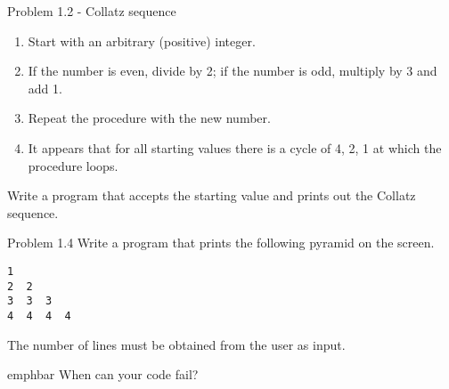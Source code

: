 \documentclass[14pt,compress]{beamer}
\newcommand{\emphbar}[1]
{\begin{beamercolorbox}[rounded=true]{emphbar} 
      {#1}
 \end{beamercolorbox}
}
\newcounter{time}
\newcommand{\inctime}[1]{\addtocounter{time}{#1}{\tiny \thetime\ m}}
\begin{document}
\begin{frame}{Problem 1.2 - Collatz sequence}
\begin{enumerate}
  \item Start with an arbitrary (positive) integer. 
  \item If the number is even, divide by 2; if the number is odd, multiply by 3 and add 1.
  \item Repeat the procedure with the new number.
  \item It appears that for all starting values there is a cycle of 4, 2, 1 at which the procedure loops.
\end{enumerate}
    Write a program that accepts the starting value and prints out the Collatz sequence.

\end{frame}

\begin{frame}[fragile]{Problem 1.4}
  Write a program that prints the following pyramid on the screen. 
  \begin{lstlisting}
1
2  2
3  3  3
4  4  4  4
  \end{lstlisting}
The number of lines must be obtained from the user as input.\\
\pause
\emphbar{When can your code fail?}
\only<2->{\inctime{20}}
\end{frame}
\end{document}
